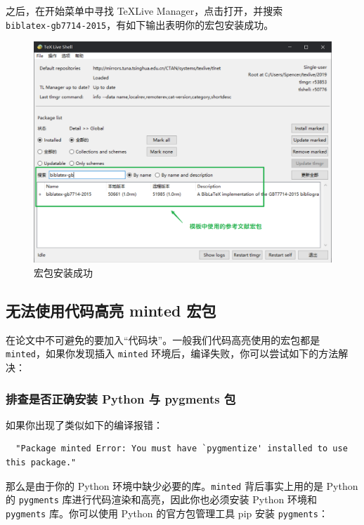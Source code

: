 之后，在开始菜单中寻找 \TeX Live Manager，点击打开，并搜索\\ \texttt{biblatex-gb7714-2015}，有如下输出表明你的宏包安装成功。

\begin{figure}[H]
  \centering
  \includegraphics[width=\textwidth]{images/package_install_success.png}
  \caption{宏包安装成功}
  \label{package_install_success}
\end{figure}

\subsection{无法使用代码高亮 minted 宏包}

在论文中不可避免的要加入“代码块”。一般我们代码高亮使用的宏包都是 \texttt{minted}，如果你发现插入 \texttt{minted} 环境后，编译失败，你可以尝试如下的方法解决：

\subsubsection{排查是否正确安装 Python 与 pygments 包}

如果你出现了类似如下的编译报错：

\begin{verbatim}
  "Package minted Error: You must have `pygmentize' installed to use this package."
\end{verbatim}

那么是由于你的 Python 环境中缺少必要的库。\texttt{minted} 背后事实上用的是 Python 的 \texttt{pygments} 库进行代码渲染和高亮，因此你也必须安装 Python 环境和 \texttt{pygments} 库。你可以使用 Python 的官方包管理工具 pip 安装 \texttt{pygments}：

